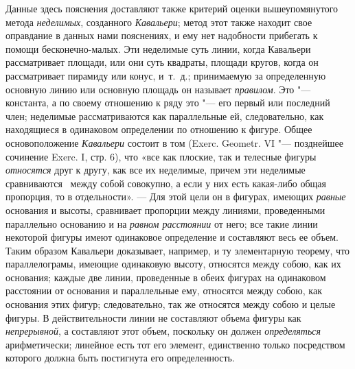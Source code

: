 Данные здесь пояснения доставляют также критерий оценки вышеупомянутого
метода {\em неделимых}, созданного
{\em Кавальери}; метод этот также находит свое
оправдание в данных нами пояснениях, и ему нет надобности прибегать к
помощи бесконечно-малых. Эти неделимые суть линии, когда Кавальери
рассматривает площади, или они суть квадраты, площади кругов, когда он
рассматривает пирамиду или конус, и~т.~д.; принимаемую за определенную
основную линию или основную площадь он называет
{\em правилом}. Это "--- константа, а по своему отношению
к ряду это "--- его первый или последний член; неделимые рассматриваются как
параллельные ей, следовательно, как находящиеся в одинаковом определении по
отношению к фигуре. Общее основоположение
{\em Кавальери} состоит в том (Exerc. Geometr. VI
"--- позднейшее сочинение Exerc. I, стр. 6), что «все как плоские, так и
телесные фигуры {\em относятся} друг к другу, как все
их неделимые, причем эти неделимые
сравниваются~ между собой совокупно, а если у них есть
какая-либо общая пропорция, то в отдельности». — Для этой цели он в
фигурах, имеющих {\em равные} основания и высоты,
сравнивает пропорции между линиями, проведенными параллельно основанию и на
{\em равном расстоянии} от него; все такие линии
некоторой фигуры имеют одинаковое определение и составляют весь ее объем.
Таким образом Кавальери доказывает, например, и ту элементарную теорему,
что параллелограмы, имеющие одинаковую высоту, относятся между собою, как
их основания; каждые две линии, проведенные в обеих фигурах на одинаковом
расстоянии от основания и параллельные ему, относятся между собою, как
основания этих фигур; следовательно, так же относятся между собою и целые
фигуры. В действительности линии не составляют объема фигуры как
{\em непрерывной}, а составляют этот объем, поскольку
он должен {\em определяться} арифметически; линейное
есть тот его элемент, единственно только посредством которого должна быть
постигнута его определенность.

